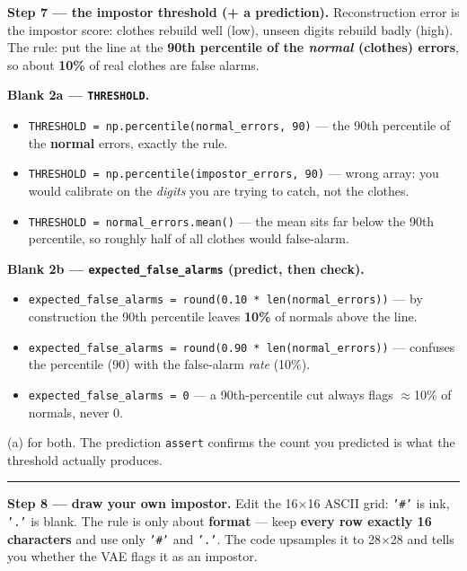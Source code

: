 \documentclass[11pt]{article}
\newcommand{\opt}[1]{\texttt{#1}}
\begin{document}
\textbf{Step 7 --- the impostor threshold (+ a prediction).}\; {\small Reconstruction error is the
impostor score: clothes rebuild well (low), unseen digits rebuild badly (high). The rule: put the
line at the \textbf{90th percentile of the \emph{normal} (clothes) errors}, so about \textbf{10\%}
of real clothes are false alarms.}

\textbf{Blank 2a --- \texttt{THRESHOLD}.}
\begin{itemize}
  \item[(a)] \opt{THRESHOLD = np.percentile(normal\_errors, 90)}\; --- the 90th percentile of the
    \textbf{normal} errors, exactly the rule.
  \item[(b)] \opt{THRESHOLD = np.percentile(impostor\_errors, 90)}\; --- wrong array: you would
    calibrate on the \emph{digits} you are trying to catch, not the clothes.
  \item[(c)] \opt{THRESHOLD = normal\_errors.mean()}\; --- the mean sits far below the 90th
    percentile, so roughly half of all clothes would false-alarm.
\end{itemize}

\textbf{Blank 2b --- \texttt{expected\_false\_alarms} (predict, then check).}
\begin{itemize}
  \item[(a)] \opt{expected\_false\_alarms = round(0.10 * len(normal\_errors))}\; --- by
    construction the 90th percentile leaves \textbf{10\%} of normals above the line.
  \item[(b)] \opt{expected\_false\_alarms = round(0.90 * len(normal\_errors))}\; --- confuses the
    percentile (90) with the false-alarm \emph{rate} (10\%).
  \item[(c)] \opt{expected\_false\_alarms = 0}\; --- a 90th-percentile cut always flags $\approx$10\%
    of normals, never 0.
\end{itemize}
{\small (a) for both. The prediction \texttt{assert} confirms the count you predicted is what the
threshold actually produces.}

\vspace{3pt}\hrule\vspace{4pt}

\textbf{Step 8 --- draw your own impostor.}\; {\small Edit the 16$\times$16 ASCII grid: \opt{'\#'} is
ink, \opt{'.'} is blank. The rule is only about \textbf{format} --- keep \textbf{every row exactly 16
characters} and use only \opt{'\#'} and \opt{'.'}. The code upsamples it to 28$\times$28 and tells
you whether the VAE flags it as an impostor.}
\end{document}
